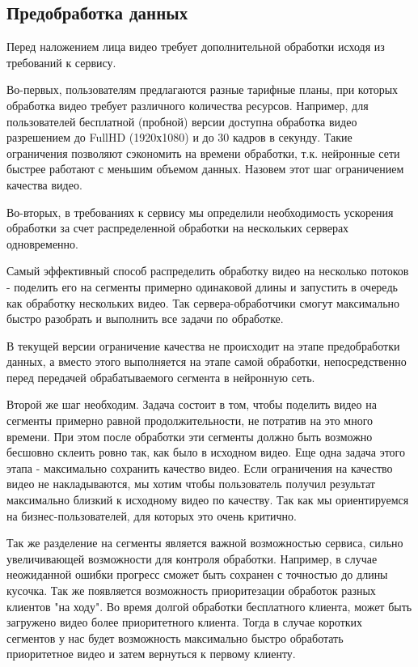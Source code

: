 \subsection{Предобработка данных}

Перед наложением лица видео требует дополнительной обработки исходя из требований к сервису.

Во-первых, пользователям предлагаются разные тарифные планы, при которых обработка видео требует различного количества ресурсов. Например, для пользователей бесплатной (пробной) версии доступна обработка видео разрешением до FullHD (1920х1080) и до 30 кадров в секунду. Такие ограничения позволяют сэкономить на времени обработки, т.к. нейронные сети быстрее работают с меньшим объемом данных. Назовем этот шаг ограничением качества видео.

Во-вторых, в требованиях к сервису мы определили необходимость ускорения обработки за счет распределенной обработки на нескольких серверах одновременно.

Самый эффективный способ распределить обработку видео на несколько потоков - поделить его на сегменты примерно одинаковой длины и запустить в очередь как обработку нескольких видео. Так сервера-обработчики смогут максимально быстро разобрать и выполнить все задачи по обработке.

В текущей версии ограничение качества не происходит на этапе предобработки данных, а вместо этого выполняется на этапе самой обработки, непосредственно перед передачей обрабатываемого сегмента в нейронную сеть.

Второй же шаг необходим. Задача состоит в том, чтобы поделить видео на сегменты примерно равной продолжительности, не потратив на это много времени. При этом после обработки эти сегменты должно быть возможно бесшовно склеить ровно так, как было в исходном видео. Еще одна задача этого этапа - максимально сохранить качество видео. Если ограничения на качество видео не накладываются, мы хотим чтобы пользователь получил результат максимально близкий к исходному видео по качеству. Так как мы ориентируемся на бизнес-пользователей, для которых это очень критично.

Так же разделение на сегменты является важной возможностью сервиса, сильно увеличивающей возможности для контроля обработки. Например, в случае неожиданной ошибки прогресс сможет быть сохранен с точностью до длины кусочка. Так же появляется возможность приоритезации обработок разных клиентов "на ходу". Во время долгой обработки бесплатного клиента, может быть загружено видео более приоритетного клиента. Тогда в случае коротких сегментов у нас будет возможность максимально быстро обработать приоритетное видео и затем вернуться к первому клиенту.

